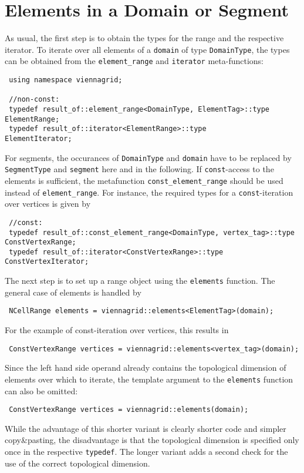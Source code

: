 \section{Elements in a Domain or Segment}
As usual, the first step is to obtain the types for the range and the respective iterator.
To iterate over all elements of a \lstinline|domain| of type \lstinline|DomainType|, the types can be obtained from the \lstinline|element_range| and \lstinline|iterator| meta-functions:
\begin{lstlisting}
 using namespace viennagrid;

 //non-const:
 typedef result_of::element_range<DomainType, ElementTag>::type    ElementRange;
 typedef result_of::iterator<ElementRange>::type          ElementIterator;
\end{lstlisting}
For segments, the occurances of \lstinline|DomainType| and \lstinline|domain| have to be replaced by \lstinline|SegmentType| and \lstinline|segment| here and in the following.
If \lstinline|const|-access to the elements is sufficient, the metafunction \lstinline|const_element_range| should be used instead of \lstinline|element_range|.
For instance, the required types for a \lstinline|const|-iteration over vertices is given by
\begin{lstlisting}
 //const:
 typedef result_of::const_element_range<DomainType, vertex_tag>::type   ConstVertexRange;
 typedef result_of::iterator<ConstVertexRange>::type         ConstVertexIterator;
\end{lstlisting}

The next step is to set up a range object using the \lstinline|elements| function.
The general case of elements is handled by
\begin{lstlisting}
 NCellRange elements = viennagrid::elements<ElementTag>(domain);
\end{lstlisting}
For the example of const-iteration over vertices, this results in
\begin{lstlisting}
 ConstVertexRange vertices = viennagrid::elements<vertex_tag>(domain);
\end{lstlisting}
Since the left hand side operand already contains the topological dimension of elements over which to iterate, 
the template argument to the \lstinline|elements| function can also be omitted:
\begin{lstlisting}
 ConstVertexRange vertices = viennagrid::elements(domain);
\end{lstlisting}
While the advantage of this shorter variant is clearly shorter code and simpler copy\&pasting, the disadvantage is that the topological dimension is specified only once in the respective \lstinline|typedef|. The longer variant adds a second check for the use of the correct topological dimension.

